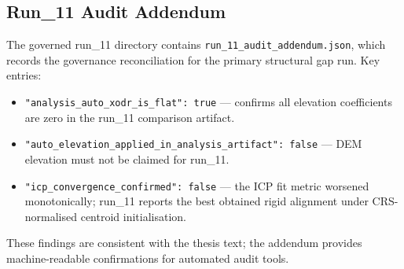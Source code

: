 \subsection{Run\_11 Audit Addendum}
The governed run\_11 directory contains \texttt{run\_11\_audit\_addendum.json}, which records the governance reconciliation for the primary structural gap run.
Key entries:
\begin{itemize}
  \item \texttt{"analysis\_auto\_xodr\_is\_flat": true} --- confirms all elevation coefficients are zero in the run\_11 comparison artifact.
  \item \texttt{"auto\_elevation\_applied\_in\_analysis\_artifact": false} --- DEM elevation must not be claimed for run\_11.
  \item \texttt{"icp\_convergence\_confirmed": false} --- the ICP fit metric worsened monotonically; run\_11 reports the best obtained rigid alignment under CRS-normalised centroid initialisation.
\end{itemize}
These findings are consistent with the thesis text; the addendum provides machine-readable confirmations for automated audit tools.
